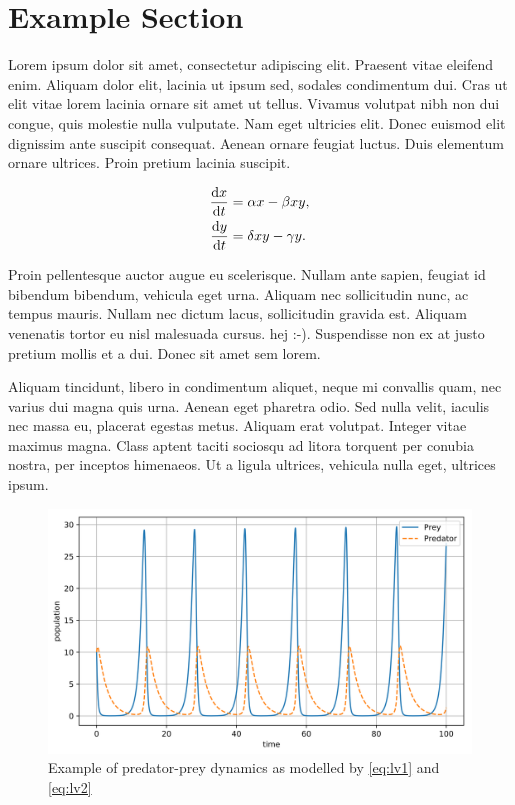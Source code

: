 \section{Example Section}
\label{sec:lvdiffeq}

Lorem ipsum dolor sit amet, consectetur adipiscing elit.
Praesent vitae eleifend enim.
Aliquam dolor elit, lacinia ut ipsum sed, sodales condimentum dui.
Cras ut elit vitae lorem lacinia ornare sit amet ut tellus.
Vivamus volutpat nibh non dui congue, quis molestie nulla vulputate.
Nam eget ultricies elit.
Donec euismod elit dignissim ante suscipit consequat.
Aenean ornare feugiat luctus.
Duis elementum ornare ultrices.
Proin pretium lacinia suscipit.

\begin{align}
  \frac{\mathrm{d} x}{\mathrm{d} t} &= \alpha x - \beta x y, \label{eq:lv1} \\
  \frac{\mathrm{d} y}{\mathrm{d} t} &= \delta xy - \gamma y .\label{eq:lv2}
\end{align}

Proin pellentesque auctor augue eu scelerisque.
Nullam ante sapien, feugiat id bibendum bibendum, vehicula eget urna.
Aliquam nec sollicitudin nunc, ac tempus mauris.
Nullam nec dictum lacus, sollicitudin gravida est.
Aliquam venenatis tortor eu nisl malesuada cursus. hej :-).
Suspendisse non ex at justo pretium mollis et a dui.
Donec sit amet sem lorem.

Aliquam tincidunt, libero in condimentum aliquet, neque mi convallis quam, nec varius dui magna quis urna.
Aenean eget pharetra odio.
Sed nulla velit, iaculis nec massa eu, placerat egestas metus.
Aliquam erat volutpat.
Integer vitae maximus magna.
Class aptent taciti sociosqu ad litora torquent per conubia nostra, per inceptos himenaeos.
Ut a ligula ultrices, vehicula nulla eget, ultrices ipsum.

\begin{figure}[htbp]
  \centering
  \includegraphics[width=0.75\linewidth]{fig/img/lotka-volterra}
  \caption{Example of predator-prey dynamics as modelled by \eqref{eq:lv1} and \eqref{eq:lv2}}
  \label{fig:lvgraph}
\end{figure}

